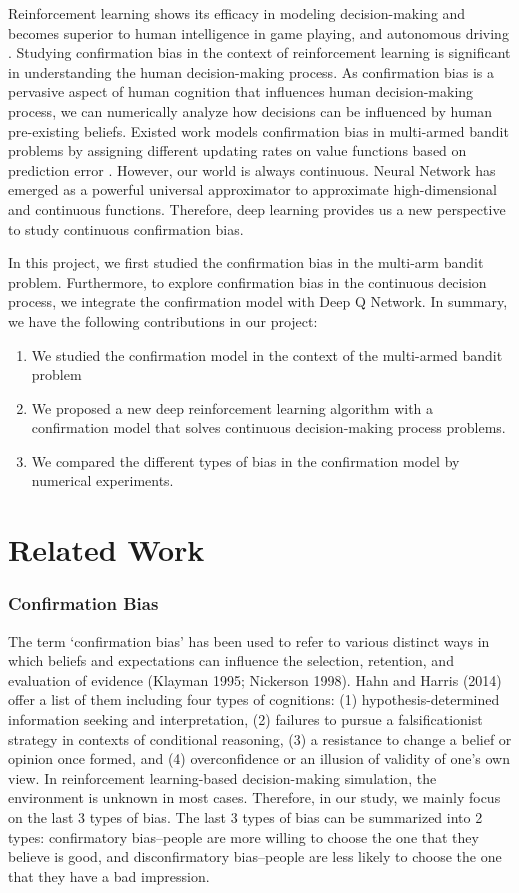 \documentclass[10pt,letterpaper]{article}
\begin{document}
Reinforcement learning shows its efficacy in modeling decision-making and becomes superior to human intelligence in game playing, and autonomous driving \cite{hester2018deep}. Studying confirmation bias in the context of reinforcement learning is significant in understanding the human decision-making process. As confirmation bias is a pervasive aspect of human cognition that influences human decision-making process, we can numerically analyze how decisions can be influenced by human pre-existing beliefs. Existed work models confirmation bias in multi-armed bandit problems by assigning different updating rates on value functions based on prediction error \cite{lefebvre2022normative}. However, our world is always continuous. Neural Network has emerged as a powerful universal approximator to approximate high-dimensional and continuous functions. Therefore, deep learning provides us a new perspective to study continuous confirmation bias.

In this project, we first studied the confirmation bias in the multi-arm bandit problem. Furthermore, to explore confirmation bias in the continuous decision process, we integrate the confirmation model with Deep Q Network.
In summary, we have the following contributions in our project:
\begin{enumerate}
    \item We studied the confirmation model in the context of the multi-armed bandit problem
    \item We proposed a new deep reinforcement learning algorithm with a confirmation model that solves continuous decision-making process problems.
    \item We compared the different types of bias in the confirmation model by numerical experiments.
\end{enumerate}
\section{Related Work}
\subsubsection{Confirmation Bias}
The term ‘confirmation bias’ has been used to refer to various distinct ways in which beliefs and expectations can influence the selection, retention, and evaluation of evidence (Klayman 1995; Nickerson 1998). Hahn and Harris (2014) offer a list of them including four types of cognitions: (1) hypothesis-determined information seeking and interpretation, (2) failures to pursue a falsificationist strategy in contexts of conditional reasoning, (3) a resistance to change a belief or opinion once formed, and (4) overconfidence or an illusion of validity of one’s own view. \cite{confirmation} In reinforcement learning-based decision-making simulation, the environment is unknown in most cases. Therefore, in our study, we mainly focus on the last 3 types of bias. The last 3 types of bias can be summarized into 2 types: confirmatory bias--people are more willing to choose the one that they believe is good, and disconfirmatory bias--people are less likely to choose the one that they have a bad impression.
\end{document}
